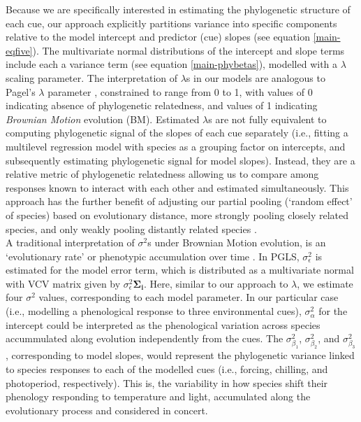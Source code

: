 \documentclass[11pt]{article}
\begin{document}
Because we are specifically interested in estimating the phylogenetic structure of each cue, our approach explicitly partitions variance into specific components relative to the model intercept and predictor (cue) slopes (see equation \ref{main-eqfive}). The multivariate normal distributions of the intercept and slope terms include each a variance term (see equation \ref{main-phybetas}), modelled with a $\lambda$ scaling parameter. The interpretation of $\lambda$s in our models are analogous to Pagel's $\lambda$  \citep{pagel1999inferring} parameter \citep{housworth2004phylogenetic}, constrained to range from 0 to 1, with values of 0 indicating absence of phylogenetic relatedness, and values of 1 indicating \emph{Brownian Motion} evolution (BM). Estimated $\lambda$s are not fully equivalent to computing phylogenetic signal of the slopes of each cue separately (i.e., fitting a multilevel regression model with species as a grouping factor on intercepts, and subsequently estimating phylogenetic signal for model slopes). Instead, they are a relative metric of phylogenetic relatedness allowing us to compare among responses known to interact with each other and estimated simultaneously. This approach has the further benefit of adjusting our partial pooling (`random effect' of species) based on evolutionary distance, more strongly pooling closely related species, and only weakly pooling distantly related species \citep[see Gaussian process models in][]{BDA}. \\%
A traditional interpretation of $\sigma^2$s under Brownian Motion evolution, is an `evolutionary rate' or phenotypic accumulation over time \citep{revell2008phylogenetic}. In PGLS, $\sigma_\epsilon^2$ is estimated for the model error term, which is distributed as a multivariate normal with VCV matrix given by $\sigma_\epsilon^2$$\boldsymbol{\Sigma_i}$. Here, similar to our approach to $\lambda$, we estimate four $\sigma^2$ values, corresponding to each model parameter. In our particular case (i.e., modelling a phenological response to three environmental cues), $\sigma_\alpha^2$ for the intercept could be interpreted as the phenological variation across species accummulated along evolution independently from the cues. The $\sigma_{\beta_1}^2$, $\sigma_{\beta_2}^2$, and $\sigma_{\beta_3}^2$, corresponding to model slopes, would represent the phylogenetic variance linked to species responses to each of the modelled cues (i.e., forcing, chilling, and photoperiod, respectively). This is, the variability in how species shift their phenology responding to temperature and light, accumulated along the evolutionary process and considered in concert. \\ 
\end{document}
